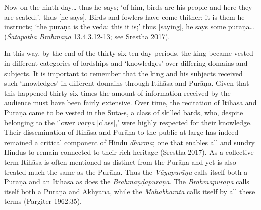 \begin{myquote}
Now on the ninth day… thus he says; ‘of him, birds are his people and here they are seated;’, thus [he says]. Birds and fowlers have come thither: it is them he instructs; ‘the purāṇa is the veda: this it is;’ thus [saying], he says some purāṇa…\hfill (\textit{Śatapatha Brāhmaṇa} 13.4.3.12-13; see Srestha 2017).
\end{myquote}

In this way, by the end of the thirty-six ten-day periods, the king became vested in different categories of lordships and ‘knowledges’ over differing domains and subjects. It is important to remember that the king and his subjects received such ‘knowledges’ in different domains through Itihāsa and Purāṇa. Given that this happened thirty-six times the amount of information received by the audience must have been fairly extensive. Over time, the recitation of Itihāsa and Purāṇa came to be vested in the Sūta-s, a class of skilled bards, who, despite belonging to the ‘lower \textit{varṇa} [class],’ were highly respected for their knowledge. Their dissemination of Itihāsa and Purāṇa to the public at large has indeed remained a critical component of Hindu \textit{dharma}; one that enables all and sundry Hindus to remain connected to their rich heritage (Srestha 2017). As a collective term Itihāsa is often mentioned as distinct from the Purāṇa and yet is also treated much the same as the Purāṇa. Thus the \textit{Vāyupurāṇa} calls itself both a Purāṇa and an Itihāsa as does the \textit{Brahmāṇḍapurāṇa}. The \textit{Brahmapurāṇa} calls itself both a Purāṇa and Ākhyāna, while the \textit{Mahābhārata} calls itself by all these terms (Pargiter 1962:35). 


